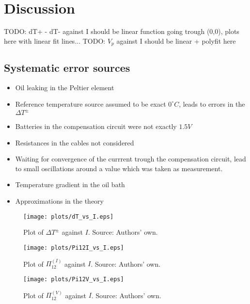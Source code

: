 \documentclass[a4paper]{article}
\begin{document}
\section{Discussion}
TODO: dT+ - dT- against I should be linear function going trough (0,0), plots here with linear fit lines...
\newline
TODO: $V_p$ against I should be linear + polyfit here

\subsection{Systematic error sources}

\begin{itemize}
\item Oil leaking in the Peltier element
\item Reference temperature source assumed to be exact $0^{\circ}C$, leads to errors in the $\Delta T^{\pm}$
\item Batteries in the compensation circuit were not exactly $1.5 V$
\item Resistances in the cables not considered
\item Waiting for convergence of the currrent trough the compensation circuit, lead to small oscillations around a value which was taken as measurement.
\item Temperature gradient in the oil bath
\item Approximations in the theory
\end{itemize}

\begin{figure}[H]
\centering
\texttt{[image: plots/dT\_vs\_I.eps]}
\caption{Plot of $\Delta T^{\pm}$ against $I$. Source: Authors' own.}
\label{fig:text}
\end{figure}

\begin{figure}[H]
\centering
\texttt{[image: plots/Pi12I\_vs\_I.eps]}
\caption{Plot of $\Pi_{12}^{(I)}$ against $I$. Source: Authors' own.}
\label{fig:text}
\end{figure}

\begin{figure}[H]
\centering
\texttt{[image: plots/Pi12V\_vs\_I.eps]}
\caption{Plot of $\Pi_{12}^{(V)}$ against $I$. Source: Authors' own.}
\label{fig:text}
\end{figure}
\end{document}
